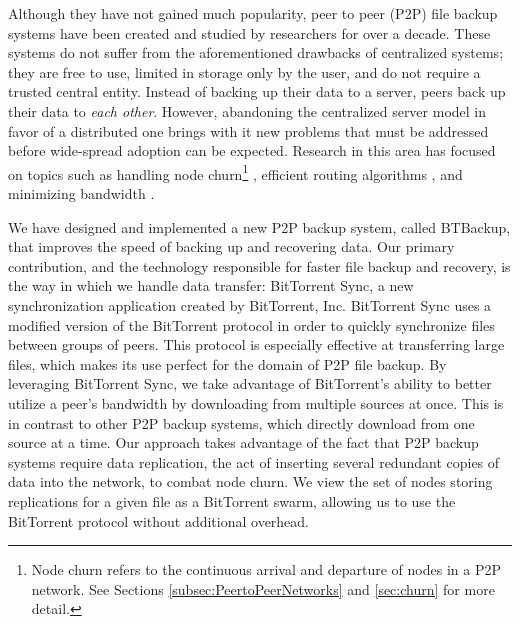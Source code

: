 \documentclass[12pt]{report}
\begin{document}
Although they have not gained much popularity, peer to peer (P2P) file backup systems have been created and studied by researchers for over a decade. These systems do not suffer from the aforementioned drawbacks of centralized systems; they are free to use, limited in storage only by the user, and do not require a trusted central entity. Instead of backing up their data to a server, peers back up their data to \textit{each other}. However, abandoning the centralized server model in favor of a distributed one brings with it new problems that must be addressed before wide-spread adoption can be expected. Research in this area has focused on topics such as handling node churn\footnote{Node churn refers to the continuous arrival and departure of nodes in a P2P network. See Sections  \ref{subsec:PeertoPeerNetworks} and \ref{sec:churn} for more detail.} \cite{ChurnResilient}, efficient routing algorithms \cite{Kademlia}, and minimizing bandwidth \cite{PeerStore}.

We have designed and implemented a new P2P backup system, called \mbox{BTBackup}, that improves the speed of backing up and recovering data. Our primary contribution, and the technology responsible for faster file backup and recovery, is the way in which we handle data transfer: BitTorrent Sync, a new synchronization application created by BitTorrent, Inc. BitTorrent Sync uses a modified version of the BitTorrent protocol \cite{BTSyncFAQ} in order to quickly synchronize files between groups of peers. This protocol is especially effective at transferring large files, which makes its use perfect for the domain of P2P file backup. By leveraging BitTorrent Sync, we take advantage of BitTorrent's ability to better utilize a peer's bandwidth by downloading from multiple sources at once. This is in contrast to other P2P backup systems, which directly download from one source at a time. Our approach takes advantage of the fact that P2P backup systems require data replication, the act of inserting several redundant copies of data into the network, to combat node churn. We view the set of nodes storing replications for a given file as a BitTorrent swarm, allowing us to use the BitTorrent protocol without additional overhead.
\end{document}
